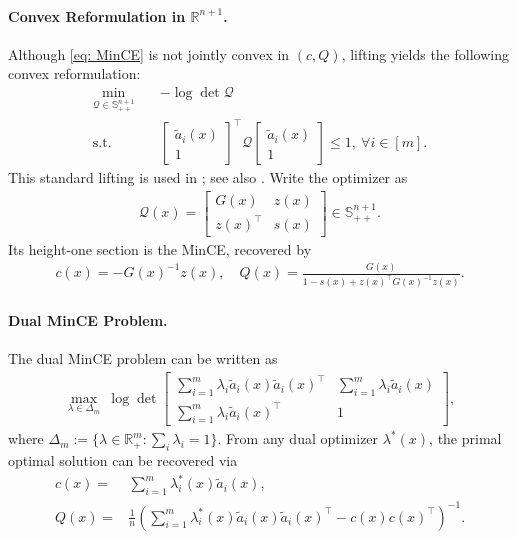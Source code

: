 \documentclass[smallextended]{svjour3}
\newcommand{\R}{\mathbb{R}}
\renewcommand{\S}{\mathbb{S}}
\begin{document}
\paragraph{Convex Reformulation in $\R^{n+1}$.} Although \eqref{eq: MinCE} is
not jointly convex in $(c,Q)$, lifting yields the following convex reformulation:
\begin{subequations}\label{eq: lifted_MinCE}
\begin{align}
    \min_{\mathcal{Q} \in \S^{n+1}_{++}} \quad & -\log \det \mathcal{Q} \\
    \mathrm{s.t.}\quad &
    \begin{bmatrix}
        \tilde{a}_i(x)\\ 1
    \end{bmatrix}^\top
    \mathcal{Q}
     \begin{bmatrix}
        \tilde{a}_i(x)\\ 1
    \end{bmatrix} \leq 1, ~\forall i\in[m].
\end{align}
\end{subequations}
This standard lifting is used in \cite{khachiyan1996rounding}; see also \cite{khachiyan1990complexity,nesterov1994interior,sunfreund2004mvce}. Write the optimizer as
\begin{align} \label{eq: lifted_MinCE_sol}
    \mathcal{Q}(x) = \begin{bmatrix}
            G(x) & z(x) \\ z(x)^\top & s(x)
    \end{bmatrix}
    \in \S^{n+1}_{++}.
\end{align}
Its height-one section is the MinCE, recovered by
\begin{align}\label{eq: MinCE_primal_sol_from_reformulation}
    c(x) = -G(x)^{-1}z(x), \quad
    Q(x) = \frac{G(x)}{1-s(x)+ z(x)^\top G(x)^{-1} z(x)}.
\end{align}
\paragraph{Dual MinCE Problem.} The dual MinCE problem can be written as
\begin{align}\label{eq: dual_MinCE}
    \max_{\lambda\in \Delta_m} ~ \log \det
    \begin{bmatrix}
        \sum_{i=1}^m \lambda_i \tilde{a}_i(x)\tilde{a}_i(x)^\top & \sum_{i=1}^m \lambda_i \tilde{a}_i(x) \\
        \sum_{i=1}^m \lambda_i \tilde{a}_i(x)^\top & 1
    \end{bmatrix},
\end{align}
where $\Delta_m:=\{\lambda\in\R^m_+:\sum_i\lambda_i=1\}$. From any dual
optimizer $\lambda^*(x)$, the primal optimal solution can be recovered via
\begin{subequations}\label{eq: MinCE_primal_sol}
\begin{align}
    c(x) = & \sum_{i=1}^m \lambda_i^*(x)\tilde a_i(x),\\
    Q(x) =&  \frac{1}{n}\left(\sum_{i=1}^m \lambda_i^*(x)\tilde a_i(x)\tilde a_i(x)^\top
    - c(x)c(x)^\top\right)^{-1}.
\end{align}
\end{subequations}
\end{document}
